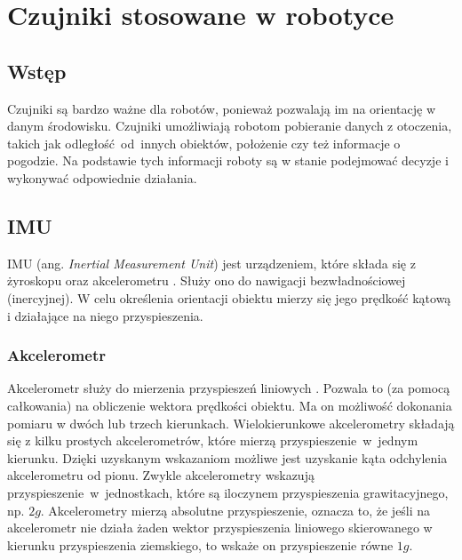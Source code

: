 \newpage
\section{Czujniki stosowane w robotyce}
{
    \subsection{Wstęp}
    {
        Czujniki są bardzo ważne dla robotów, ponieważ pozwalają im na orientację w danym środowisku. Czujniki umożliwiają robotom pobieranie danych z otoczenia, takich jak odległość~od~innych obiektów, położenie czy też informacje o pogodzie. Na podstawie tych informacji roboty są w stanie podejmować decyzje i wykonywać odpowiednie działania.
    }
    \subsection{IMU}
    {
        IMU (ang. \textit{Inertial Measurement Unit}) jest urządzeniem, które składa się z żyroskopu oraz akcelerometru \cite{imu}. Służy ono do nawigacji bezwładnościowej (inercyjnej). W celu określenia orientacji obiektu mierzy się jego prędkość kątową i działające na niego przyspieszenia.
        \cite{imu_article}
        \subsubsection{Akcelerometr}
        {
            Akcelerometr służy do mierzenia przyspieszeń liniowych \cite{acceleromter}. Pozwala to (za pomocą całkowania) na obliczenie wektora prędkości obiektu. Ma on możliwość dokonania pomiaru w dwóch lub trzech kierunkach. Wielokierunkowe akcelerometry składają się z kilku prostych akcelerometrów, które mierzą przyspieszenie~w~jednym kierunku. Dzięki uzyskanym wskazaniom możliwe jest uzyskanie kąta odchylenia akcelerometru od pionu. Zwykle akcelerometry wskazują przyspieszenie~w~jednostkach, które są iloczynem przyspieszenia grawitacyjnego, np. $2g$. Akcelerometry mierzą absolutne przyspieszenie, oznacza to, że jeśli na akcelerometr nie działa żaden wektor przyspieszenia liniowego skierowanego w kierunku przyspieszenia ziemskiego, to wskaże on przyspieszenie równe $1g$.
        }
}}
